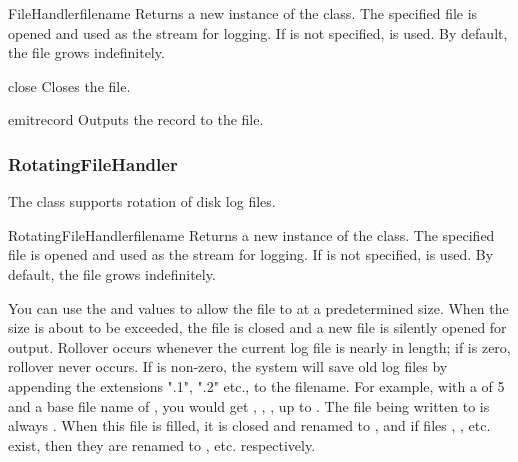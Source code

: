 \begin{classdesc}{FileHandler}{filename}
Returns a new instance of the  class. The specified
file is opened and used as the stream for logging. If  is
not specified,  is used. By default, the file grows
indefinitely.
\end{classdesc}

\begin{methoddesc}{close}{}
Closes the file.
\end{methoddesc}

\begin{methoddesc}{emit}{record}
Outputs the record to the file.
\end{methoddesc}

\subsubsection{RotatingFileHandler}

The  class supports rotation of disk log files.

\begin{classdesc}{RotatingFileHandler}{filename}
Returns a new instance of the  class. The
specified file is opened and used as the stream for logging. If
 is not specified,  is used. By default, the
file grows indefinitely.

You can use the  and
 values to allow the file to  at a
predetermined size. When the size is about to be exceeded, the file is
closed and a new file is silently opened for output. Rollover occurs
whenever the current log file is nearly  in length; if
 is zero, rollover never occurs.  If 
is non-zero, the system will save old log files by appending the
extensions ".1", ".2" etc., to the filename. For example, with
a  of 5 and a base file name of
, you would get ,
, , up to . The file being
written to is always .  When this file is filled, it is
closed and renamed to , and if files ,
, etc.  exist, then they are renamed to ,
 etc.  respectively.
\end{classdesc}

